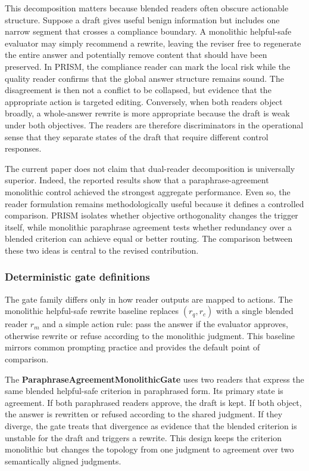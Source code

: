 \documentclass{article}
\begin{document}
This decomposition matters because blended readers often obscure actionable structure. Suppose a draft gives useful benign information but includes one narrow segment that crosses a compliance boundary. A monolithic helpful-safe evaluator may simply recommend a rewrite, leaving the reviser free to regenerate the entire answer and potentially remove content that should have been preserved. In PRISM, the compliance reader can mark the local risk while the quality reader confirms that the global answer structure remains sound. The disagreement is then not a conflict to be collapsed, but evidence that the appropriate action is targeted editing. Conversely, when both readers object broadly, a whole-answer rewrite is more appropriate because the draft is weak under both objectives. The readers are therefore discriminators in the operational sense that they separate states of the draft that require different control responses.

The current paper does not claim that dual-reader decomposition is universally superior. Indeed, the reported results show that a paraphrase-agreement monolithic control achieved the strongest aggregate performance. Even so, the reader formulation remains methodologically useful because it defines a controlled comparison. PRISM isolates whether objective orthogonality changes the trigger itself, while monolithic paraphrase agreement tests whether redundancy over a blended criterion can achieve equal or better routing. The comparison between these two ideas is central to the revised contribution.

\subsubsection{Deterministic gate definitions}

\label{sec:deterministic_gate_definitions}

The gate family differs only in how reader outputs are mapped to actions. The monolithic helpful-safe rewrite baseline replaces \((r_q, r_c)\) with a single blended reader \(r_m\) and a simple action rule: pass the answer if the evaluator approves, otherwise rewrite or refuse according to the monolithic judgment. This baseline mirrors common prompting practice and provides the default point of comparison.

The \textbf{ParaphraseAgreementMonolithicGate} uses two readers that express the same blended helpful-safe criterion in paraphrased form. Its primary state is agreement. If both paraphrased readers approve, the draft is kept. If both object, the answer is rewritten or refused according to the shared judgment. If they diverge, the gate treats that divergence as evidence that the blended criterion is unstable for the draft and triggers a rewrite. This design keeps the criterion monolithic but changes the topology from one judgment to agreement over two semantically aligned judgments.
\end{document}
